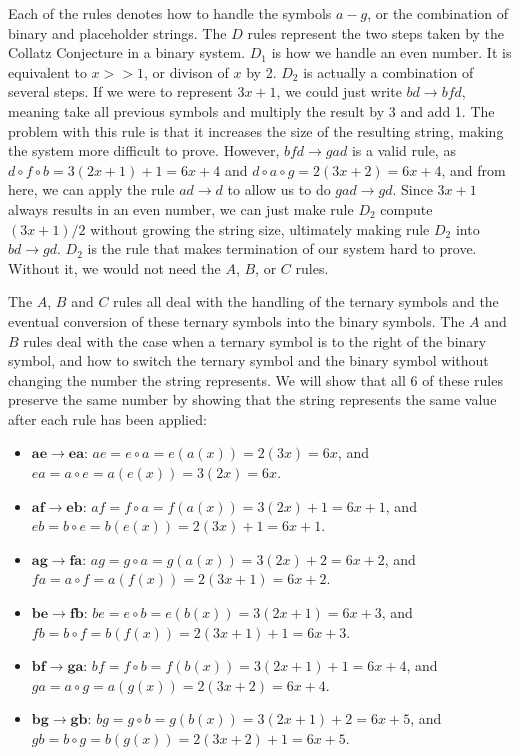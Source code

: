 Each of the rules denotes how to handle the symbols $a-g$, or the combination of binary and placeholder strings. The $D$ rules represent the two steps taken by the Collatz Conjecture in a binary system. $D_1$ is how we handle an even number. It is equivalent to $x >> 1$, or divison of $x$ by 2. $D_2$ is actually a combination of several steps. If we were to represent $3x+1$, we could just write $bd \rightarrow bfd$, meaning take all previous symbols and multiply the result by 3 and add 1. The problem with this rule is that it increases the size of the resulting string, making the system more difficult to prove. However, $bfd \rightarrow gad$ is a valid rule,  as $d \circ f \circ b = 3(2x+1)+1 = 6x+4$ and $d \circ a \circ g = 2(3x+2) = 6x+4$, and from here, we can apply the rule $ad \rightarrow d$ to allow us to do $gad \rightarrow gd$. Since $3x+1$ always results in an even number, we can just make rule $D_2$ compute $(3x+1)/2$ without growing the string size, ultimately making rule $D_2$ into $bd \rightarrow gd$. $D_2$ is the rule that makes termination of our system hard to prove. Without it, we would not need the $A$, $B$, or $C$ rules.\par
The $A$, $B$ and $C$ rules all deal with the handling of the ternary symbols and the eventual conversion of these ternary symbols into the binary symbols. The $A$ and $B$ rules deal with the case when a ternary symbol is to the right of the binary symbol, and how to switch the ternary symbol and the binary symbol without changing the number the string represents. We will show that all 6 of these rules preserve the same number by showing that the string represents the same value after each rule has been applied:
\begin{itemize}
    \item $\boldsymbol{ae \rightarrow ea}$: $ae = e \circ a = e(a(x)) = 2(3x) = 6x$, and $ea = a
    \circ e = a(e(x)) = 3(2x) = 6x$.
    \item $\boldsymbol{af \rightarrow eb}$: $af = f \circ a = f(a(x)) = 3(2x)+1 = 6x+1$, and $eb =
    b \circ e = b(e(x)) = 2(3x)+1 = 6x+1$.
    \item $\boldsymbol{ag \rightarrow fa}$: $ag = g \circ a = g(a(x)) = 3(2x)+2 = 6x+2$, and $fa = a \circ f = a(f(x)) = 2(3x+1) = 6x+2$.
    \item $\boldsymbol{be \rightarrow fb}$: $be = e \circ b = e(b(x)) = 3(2x+1) = 6x+3$, and $fb = b \circ f = b(f(x)) = 2(3x+1)+1 = 6x+3$.
    \item $\boldsymbol{bf \rightarrow ga}$: $bf = f \circ b = f(b(x)) = 3(2x+1)+1 = 6x+4$, and $ga =  a \circ g = a(g(x)) = 2(3x+2) = 6x+4$.
    \item $\boldsymbol{bg \rightarrow gb}$: $bg = g \circ b = g(b(x)) = 3(2x+1)+2 = 6x+5$, and $gb = b \circ g = b(g(x)) = 2(3x+2)+1 = 6x+5$.
\end{itemize}
